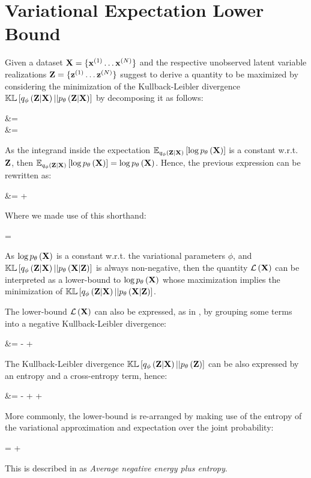 \section{Variational Expectation Lower Bound}

Given a 
dataset $\mathbf{X} = \{{\mathbf{x}^{(1)}} \ldots {\mathbf{x}^{(N)}} \}$
and the respective unobserved latent variable realizations
$\mathbf{Z} = \{{\mathbf{z}^{(1)}} \ldots {\mathbf{z}^{(N)}}\}$
\cite{Fox2012}
suggest to derive a quantity to be maximized by considering the minimization
of the Kullback-Leibler divergence $\mathbb{KL}\left[ q_\phi\left(\mathbf{Z}|\mathbf{X}\right) || p_\theta\left(\mathbf{Z}|\mathbf{X}\right) \right]$ by decomposing it as follows:

\begin{nalign}
\kl{\qphiZ}{\pZcond} &=
\expectqphiZ{\log \frac{\qphiZ}{\pZcond}}\\
&= \expectqphiZ{\log \qphiZ - \log \pXcond - \log \pZ + \log \pX}
\end{nalign}

As the integrand inside the expectation $\mathbb{E}_{q_\phi\left(\mathbf{Z}|\mathbf{X}\right)}\left[ \log p_\theta\left(\mathbf{X}\right) \right]$ 
is a constant w.r.t. $\mathbf{Z}$, then $\mathbb{E}_{q_\phi\left(\mathbf{Z}|\mathbf{X}\right)}\left[ \log p_\theta\left(\mathbf{X}\right) \right]=\log p_\theta\left(\mathbf{X}\right)$. Hence, the
previous expression can be rewritten as:

\begin{nalign}
\log \pX &= \kl{\qphiZ}{\pXcond}
+ \elboX
\end{nalign}

Where we made use of this shorthand:
\begin{nalign}
    \elboX = \expectqphiZ{-\log \qphiZ + \log \pXcond + \log \pZ}
\end{nalign}

As $\log p_\theta\left(\mathbf{X}\right)$ is a constant w.r.t. the variational parameters $\phi$,
and $\mathbb{KL}\left[ q_\phi\left(\mathbf{Z}|\mathbf{X}\right) || p_\theta\left(\mathbf{X}|\mathbf{Z}\right) \right]$ is always non-negative,
then the quantity $\mathcal{L}\left(\mathbf{X}\right)$ can be interpreted as a lower-bound to $\log p_\theta\left(\mathbf{X}\right)$
whose maximization implies the minimization of $\mathbb{KL}\left[ q_\phi\left(\mathbf{Z}|\mathbf{X}\right) || p_\theta\left(\mathbf{X}|\mathbf{Z}\right) \right]$.

The lower-bound $\mathcal{L}\left(\mathbf{X}\right)$ can also be expressed, as in \cite{1312.6114},
by grouping some terms
into a negative Kullback-Leibler divergence:
\begin{nalign}
\elboX 
&= -\kl{\qphiZ}{\pZ} + \expectqphiZ{\log \pXcond}
\end{nalign}

The Kullback-Leibler divergence $\mathbb{KL}\left[ q_\phi\left(\mathbf{Z}|\mathbf{X}\right) || p_\theta\left(\mathbf{Z}\right) \right]$ can be also expressed by 
an entropy and a cross-entropy term, hence:

\begin{nalign}\label{elbo_crossentropy}
\elboX 
&= -\entropy{\qphiZ,\pZ} + \entropy{\qphiZ} + \expectqphiZ{\log \pXcond}
\end{nalign}

More commonly, the lower-bound is re-arranged by making use of
the entropy of the variational approximation
and expectation over the joint probability:

\begin{nalign}
\elboX = \entropy{\qphiZ} + \expectqphiZ{\log \pXZ}
\end{nalign}

This is described in \cite{surgery} as \emph{Average negative energy plus entropy}.

